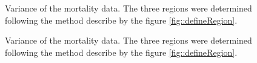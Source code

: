 \begin{refsection}
\begin{figure}
	\centering
	
	\caption{Variance of the mortality data. The three regions were determined following the method describe by the figure \ref{fig::defineRegion}. \label{fig::mortalityVar10-12}}
\end{figure}

\begin{figure}
	\centering
	
	\caption{Variance of the mortality data. The three regions were determined following the method describe by the figure \ref{fig::defineRegion}. \label{fig::mortalityVar13-14}}
\end{figure}


\printbibliography[heading=subbibliography]
\end{refsection}
